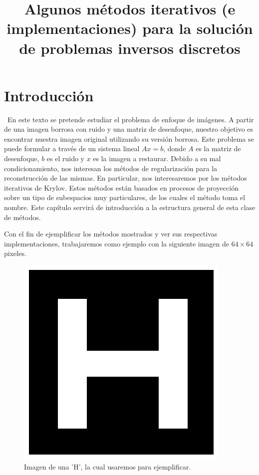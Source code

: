 \documentclass[12pt, oneside]{book}
\title{Algunos métodos iterativos (e implementaciones) para la solución de problemas inversos discretos}
\author{}
\date{}
\begin{document}
	\maketitle
	\tableofcontents
	
	
	\chapter{Introducción}
	\ En este texto se pretende estudiar el problema de enfoque de imágenes. A partir de una imagen borrosa con ruido y una matriz de desenfoque, nuestro objetivo es encontrar nuestra imagen original utilizando su versión borrosa. Este problema se puede formular a través de un sistema lineal $Ax = b$, donde $A$ es la matriz de desenfoque, $b$ es el ruido y $x$ es la imagen a restaurar. Debido a su mal condicionamiento, nos interesan los métodos de regularización para la reconstrucción de las mismas. En particular, nos interesaremos por los métodos iterativos de Krylov. Estos métodos están basados en procesos de proyección sobre un tipo de subespacios muy particulares, de los cuales el método toma el nombre. Este capítulo servirá de introducción a la estructura general de esta clase de métodos.
	
	Con el fin de ejemplificar los métodos mostrados y ver sus respectivas implementaciones, trabajaremos como ejemplo con la siguiente imagen de $64\times 64$ pixeles.
	
	\begin{figure}[H]
		\centering
		\includegraphics[scale=0.5]{Imagenes/H.png}
		\caption{Imagen de una 'H', la cual usaremos para ejemplificar.\\}
	\end{figure}
	
\end{document}
